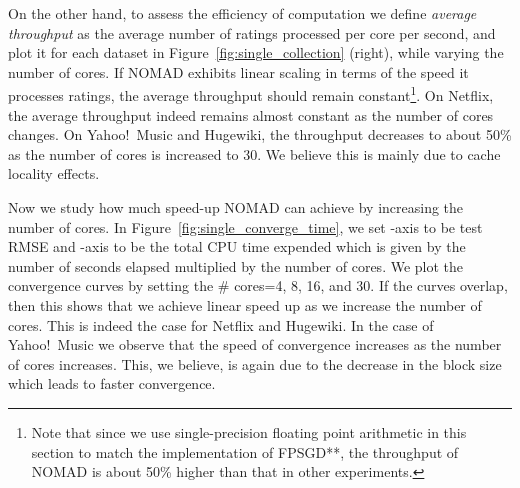 \documentclass{vldb}
\begin{document}
On the other hand, to assess the efficiency of computation we define
\emph{average throughput} as the average number of ratings processed
per core per second, and plot it for each dataset in
Figure~\ref{fig:single_collection} (right), while varying the number
of cores.  If NOMAD exhibits linear scaling in terms of the speed it
processes ratings, the average throughput should remain
constant\footnote{Note that since we use single-precision floating
  point arithmetic in this section to match the implementation of
  FPSGD**, the throughput of NOMAD is about 50\% higher than that in
  other experiments.}.  On Netflix, the average throughput
indeed remains almost constant as the number of cores changes.  On
Yahoo!~Music and Hugewiki, the throughput decreases to about
50\% as the number of cores is increased to 30.  We believe this is
mainly due to cache locality effects. 

Now we study how much speed-up NOMAD can achieve by increasing the
number of cores.  In Figure~\ref{fig:single_converge_time}, we set
-axis to be test RMSE and -axis to be the total CPU time expended
which is given by the number of seconds elapsed multiplied by the number
of cores.  We plot the convergence curves by setting the \# cores=4, 8,
16, and 30. If the curves overlap, then this shows that we achieve
linear speed up as we increase the number of cores. This is indeed the
case for Netflix and Hugewiki. In the case of Yahoo!~Music we observe
that the speed of convergence increases as the number of cores
increases. This, we believe, is again due to the decrease in the block
size which leads to faster convergence.
\end{document}
